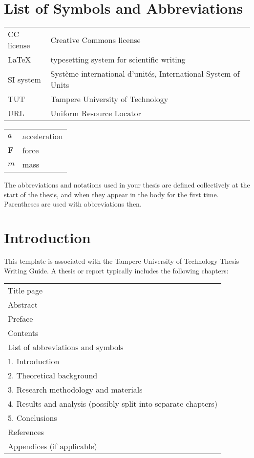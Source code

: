 \documentclass[twoside]{tutthesis} %
\begin{document}
\listoffigures



\chapter*{List of Symbols and Abbreviations}


\begin{tabular}[h]{@{} p{} p{} @{}}
CC license & Creative Commons license \\
LaTeX & typesetting system for scientific writing \\
SI system & Système international d'unités, International System of Units \\
TUT & Tampere University of Technology \\
URL & Uniform Resource Locator 
\end{tabular}

\begin{tabular}[h]{@{} p{} p{} @{}}
$a$ & acceleration \\
$\mathbf{F}$ & force \\
$m$ & mass
\end{tabular}

The abbreviations and notations used in your thesis are defined collectively at the start of the thesis, and when they appear in the body for the first time.
Parentheses are used with abbreviations then.



\chapter{Introduction}
\label{ch:Introduction}

This template is associated with the Tampere University of Technology Thesis Writing Guide.
A thesis or report typically includes the following chapters:

\begin{tabular}[h]{l}
Title page\\
Abstract\\

Preface\\
Contents\\
List of abbreviations and symbols\\
1. Introduction\\
2. Theoretical background\\
3. Research methodology and materials\\
4. Results and analysis (possibly split into separate chapters) \\
5. Conclusions\\
References\\
Appendices (if applicable)
\end{tabular}
\end{document}

